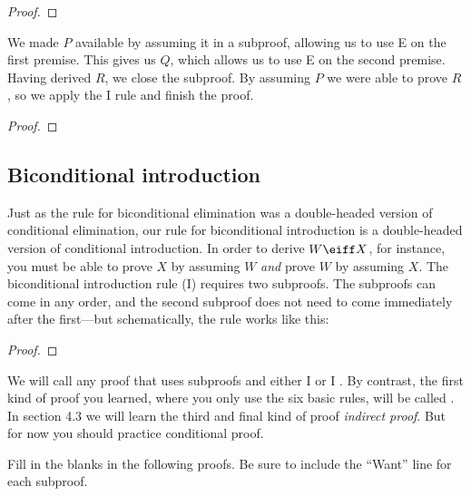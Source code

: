 \begin{proof}
	\open
	\close
\end{proof}

We made $P$ available by assuming it in a subproof, allowing us to use {\eif}E on the first premise. This gives us $Q$, which allows us to use {\eif}E on the second premise. Having derived  $R$, we close the subproof. By assuming $P$ we were able to prove $R$, so we apply the {\eif}I rule and finish the proof.

\label{HSproof}
\begin{proof}
	\open
	\close
\end{proof}


\subsection{Biconditional introduction}

Just as the rule for biconditional elimination was a double-headed version of conditional elimination, our rule for biconditional introduction is a double-headed version of conditional introduction. In order to derive $W \eiff X$, for instance, you must be able to prove $X$ by assuming $W$ \emph{and} prove $W$ by assuming $X$. The biconditional introduction rule ({\eiff}I) requires two subproofs. The subproofs can come in any order, and the second subproof does not need to come immediately after the first---but schematically, the rule works like this:

\begin{proof}
	\open
		 
	\close
	\open
		 
	\close
\end{proof}

We will call any proof that uses subproofs and either \eif I or \eiff I . By contrast, the first kind of proof you learned, where you only use the six basic rules, will be called . In section 4.3 we will learn the third and final  kind of proof \emph{indirect proof}. But for now you should practice conditional proof. 

\practiceproblems
\noindent\problempart Fill in the blanks in the following proofs. Be sure to include the ``Want'' line for each subproof. 

